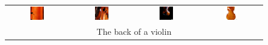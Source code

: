 \begin{figure}[ht!]
\begin{tabular}{cccc}
        \includegraphics[width=0.24\textwidth]{figures/scaling_comparison/violin_0.jpg} &
        \includegraphics[width=0.24\textwidth]{figures/scaling_comparison/violin_1.jpg} &
        \includegraphics[width=0.24\textwidth]{figures/scaling_comparison/violin_2.jpg} &
        \includegraphics[width=0.24\textwidth]{figures/scaling_comparison/violin_3.jpg}\vspace{1mm} \\
        \multicolumn{4}{c}{\small The back of a violin}\vspace{3mm}\\


\end{tabular}
\end{figure}
